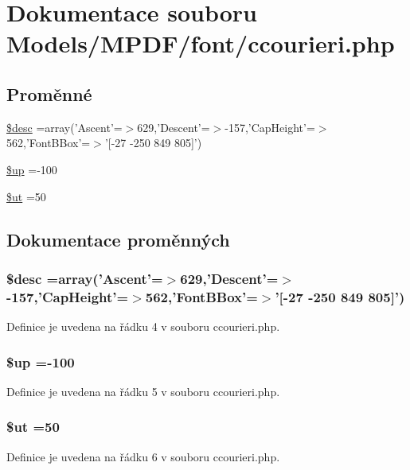 \hypertarget{ccourieri_8php}{\section{Dokumentace souboru Models/\-M\-P\-D\-F/font/ccourieri.php}
\label{ccourieri_8php}
}
\subsection*{Proměnné}
\begin{DoxyCompactItemize}
\item 
\hyperlink{ccourieri_8php_a31059b9e4d0c5af34df20da32232ea9a}{\$desc} =array('Ascent'=$>$629,'Descent'=$>$-\/157,'Cap\-Height'=$>$562,'Font\-B\-Box'=$>$'\mbox{[}-\/27 -\/250 849 805\mbox{]}')
\item 
\hyperlink{ccourieri_8php_a6b5ad2ac55f9df46e8f34e78fbd6f176}{\$up} =-\/100
\item 
\hyperlink{ccourieri_8php_aadd3f841051043ee58e587e840e8dd0b}{\$ut} =50
\end{DoxyCompactItemize}


\subsection{Dokumentace proměnných}
\hypertarget{ccourieri_8php_a31059b9e4d0c5af34df20da32232ea9a}{
\subsubsection[{\$desc}]{\setlength{\rightskip}{0pt plus 5cm}\$desc =array('Ascent'=$>$629,'Descent'=$>$-\/157,'Cap\-Height'=$>$562,'Font\-B\-Box'=$>$'\mbox{[}-\/27 -\/250 849 805\mbox{]}')}}\label{ccourieri_8php_a31059b9e4d0c5af34df20da32232ea9a}


Definice je uvedena na řádku 4 v souboru ccourieri.\-php.

\hypertarget{ccourieri_8php_a6b5ad2ac55f9df46e8f34e78fbd6f176}{
\subsubsection[{\$up}]{\setlength{\rightskip}{0pt plus 5cm}\$up =-\/100}}\label{ccourieri_8php_a6b5ad2ac55f9df46e8f34e78fbd6f176}


Definice je uvedena na řádku 5 v souboru ccourieri.\-php.

\hypertarget{ccourieri_8php_aadd3f841051043ee58e587e840e8dd0b}{
\subsubsection[{\$ut}]{\setlength{\rightskip}{0pt plus 5cm}\$ut =50}}\label{ccourieri_8php_aadd3f841051043ee58e587e840e8dd0b}


Definice je uvedena na řádku 6 v souboru ccourieri.\-php.

